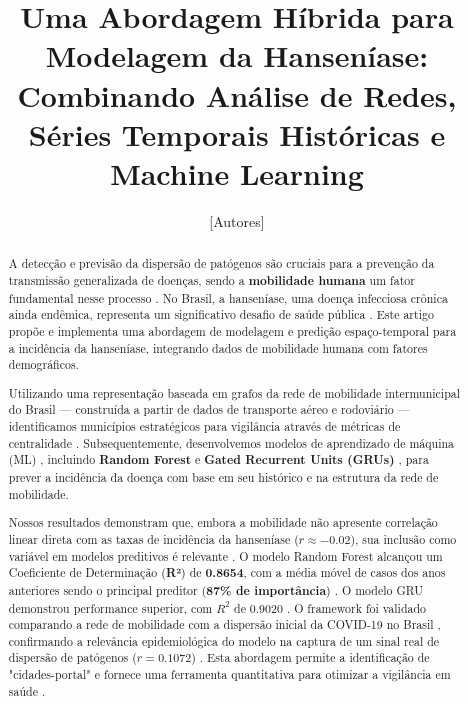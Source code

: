 \documentclass[preprint,12pt]{elsarticle}
\begin{document}
\begin{frontmatter}

\title{Uma Abordagem Híbrida para Modelagem da Hanseníase: Combinando Análise de Redes, Séries Temporais Históricas e Machine Learning}

\author{[Autores]} %

\begin{abstract}
A detecção e previsão da dispersão de patógenos são cruciais para a prevenção da transmissão generalizada de doenças, sendo a \textbf{mobilidade humana} um fator fundamental nesse processo \cite{oliveira2024summary, inovacao2024modelagem, tang2021fields}. No Brasil, a hanseníase, uma doença infecciosa crônica ainda endêmica, representa um significativo desafio de saúde pública \cite{inovacao2024computacional, pcdt2022protocolo}. Este artigo propõe e implementa uma abordagem de modelagem e predição espaço-temporal para a incidência da hanseníase, integrando dados de mobilidade humana com fatores demográficos. 

Utilizando uma representação baseada em grafos da rede de mobilidade intermunicipal do Brasil — construída a partir de dados de transporte aéreo e rodoviário \cite{oliveira2024mobility} — identificamos municípios estratégicos para vigilância através de métricas de centralidade \cite{inovacao2024modelagem, inovacao2024analise}. Subsequentemente, desenvolvemos modelos de aprendizado de máquina (ML) \cite{mooney2018big, lecu2015deep}, incluindo \textbf{Random Forest} e \textbf{Gated Recurrent Units (GRUs)} \cite{shahidi2024exploring, silva2022machine}, para prever a incidência da doença com base em seu histórico e na estrutura da rede de mobilidade. 

Nossos resultados demonstram que, embora a mobilidade não apresente correlação linear direta com as taxas de incidência da hanseníase ($r \approx -0.02$), sua inclusão como variável em modelos preditivos é relevante \cite{inovacao2024modelagem, inovacao2024analise}. O modelo Random Forest alcançou um Coeficiente de Determinação (\textbf{R²}) de \textbf{0.8654}, com a média móvel de casos dos anos anteriores sendo o principal preditor (\textbf{87\% de importância}) \cite{inovacao2024modelagem}. O modelo GRU demonstrou performance superior, com $R^2$ de 0.9020 \cite{inovacao2024modelagem}. O framework foi validado comparando a rede de mobilidade com a dispersão inicial da COVID-19 no Brasil \cite{inovacao2024modelagem}, confirmando a relevância epidemiológica do modelo na captura de um sinal real de dispersão de patógenos ($r = 0.1072$) \cite{inovacao2024modelagem, oliveira2024summary}. Esta abordagem permite a identificação de "cidades-portal" e fornece uma ferramenta quantitativa para otimizar a vigilância em saúde \cite{inovacao2024modelagem}.
\end{abstract}


\end{frontmatter}
\end{document}
